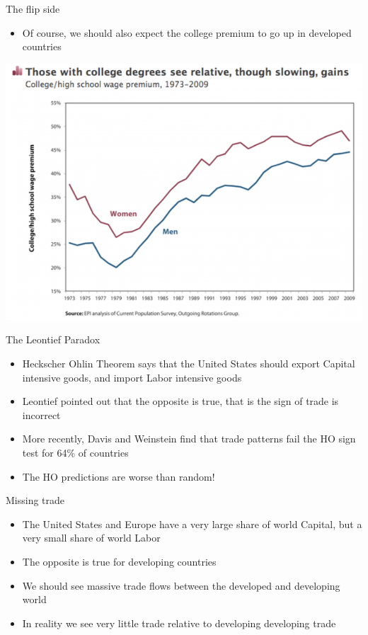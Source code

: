 \documentclass[ignorenonframetext,]{beamer}
\begin{document}
\begin{frame}{The flip side}

    \begin{itemize}
        \item Of course, we should also expect the college premium to go up in developed countries
    \end{itemize}
    \includegraphics[scale=0.25]{US_college_premium.png}

\end{frame}

\begin{frame}{The Leontief Paradox}

    \begin{itemize}
        \item Heckscher Ohlin Theorem says that the United States should export Capital intensive goods, and import Labor intensive goods
        \item Leontief pointed out that the opposite is true, that is the sign of trade is incorrect
        \item More recently, Davis and Weinstein find that trade patterns fail the HO sign test for 64\% of countries 
        \item The HO predictions are worse than random!
    \end{itemize}

\end{frame}

\begin{frame}{Missing trade}

    \begin{itemize}
        \item The United States and Europe have a very large share of world Capital, but a very small share of world Labor 
        \item The opposite is true for developing countries 
        \item We should see massive trade flows between the developed and developing world
        \item In reality we see very little trade relative to developing developing trade
    \end{itemize}

\end{frame}
\end{document}
